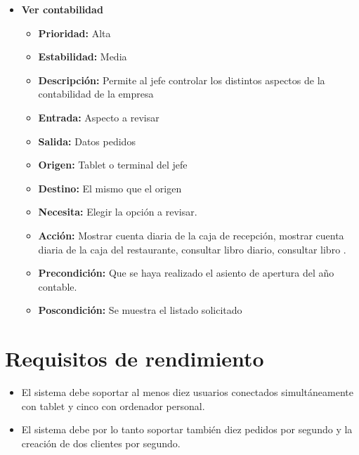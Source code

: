 \documentclass[spanish,a4paper,11pt, twoside]{report}	%
\begin{document}
\begin{itemize}
\begin{itemize}
		\end{itemize}%

		\item \textbf{Ver contabilidad} %

		\begin{itemize}

			\item \textbf{Prioridad: }Alta
			\item \textbf{Estabilidad: }Media
			\item \textbf{Descripción: }Permite al jefe controlar los distintos aspectos de la contabilidad de la empresa
			\item \textbf{Entrada: } Aspecto a revisar
			\item \textbf{Salida: } Datos pedidos
			\item \textbf{Origen: } Tablet o terminal del jefe
			\item \textbf{Destino: } El mismo que el origen
			\item \textbf{Necesita: } Elegir la opción a revisar.
			\item \textbf{Acción: }Mostrar cuenta diaria de la caja de recepción, mostrar cuenta diaria de la caja del restaurante, consultar libro diario, consultar libro .
			\item \textbf{Precondición: } Que se haya realizado el asiento de apertura del año contable.
			\item \textbf{Poscondición: } Se muestra el listado solicitado

		\end{itemize}%

\end{itemize}%

\section{Requisitos de rendimiento}
\begin{itemize}
	\item El sistema debe soportar al menos diez usuarios conectados simultáneamente con tablet y cinco con ordenador personal.
	\item El sistema debe por lo tanto soportar también diez pedidos por segundo y la creación de dos clientes por segundo. 
\end{itemize}
\end{document}
